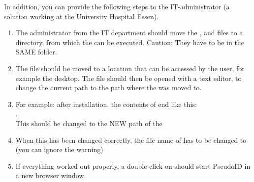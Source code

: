 In addition, you can provide the following steps to the IT-administrator (a solution working at the University Hospital Essen).

\begin{enumerate}
    
    \item The administrator from the IT department should move the ,  and   files to a directory, from which the  can be executed. Caution: They have to be in the SAME folder. 
    
    \item The  file should be moved to a location that can be accessed by the user, for example the desktop. The file should then be opened with a text editor, to change the current path to the path where the  was moved to.
    \label{item:admin}
    
    \item For example: after installation, the contents of  end like this: \\ . \\ This should be changed to the NEW path of the 
    
    \item When this has been changed correctly, the file name of  has to be changed to  (you can ignore the warning)
    
    \item If everything worked out properly, a double-click on  should start PseudoID in a new browser window.
\end{enumerate} 



